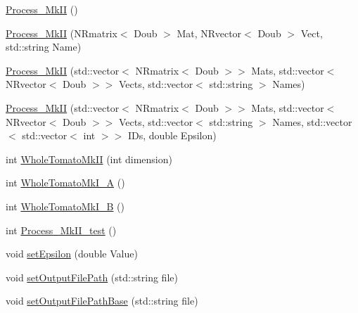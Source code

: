 \begin{DoxyCompactItemize}
\item 
\hyperlink{class_p_r_p_s_evolution_1_1_solve_1_1_process___mk_i_i_a50ba1abbd5eb1953d179a756046ba573}{\-Process\-\_\-\-Mk\-I\-I} ()
\item 
\hyperlink{class_p_r_p_s_evolution_1_1_solve_1_1_process___mk_i_i_a5f2197d42ea75b99a67bb74ff7aa4aae}{\-Process\-\_\-\-Mk\-I\-I} (\-N\-Rmatrix$<$ \-Doub $>$ \-Mat, \-N\-Rvector$<$ \-Doub $>$ \-Vect, std\-::string \-Name)
\item 
\hyperlink{class_p_r_p_s_evolution_1_1_solve_1_1_process___mk_i_i_a146adf1be0c03a472654c4a4ad3a8231}{\-Process\-\_\-\-Mk\-I\-I} (std\-::vector$<$ \-N\-Rmatrix$<$ \-Doub $>$$>$ \-Mats, std\-::vector$<$ \-N\-Rvector$<$ \-Doub $>$$>$ \-Vects, std\-::vector$<$ std\-::string $>$ \-Names)
\item 
\hyperlink{class_p_r_p_s_evolution_1_1_solve_1_1_process___mk_i_i_acd4eedce68bf99c08539ca1852182772}{\-Process\-\_\-\-Mk\-I\-I} (std\-::vector$<$ \-N\-Rmatrix$<$ \-Doub $>$$>$ \-Mats, std\-::vector$<$ \-N\-Rvector$<$ \-Doub $>$$>$ \-Vects, std\-::vector$<$ std\-::string $>$ \-Names, std\-::vector$<$ std\-::vector$<$ int $>$$>$ \-I\-Ds, double \-Epsilon)
\item 
int \hyperlink{class_p_r_p_s_evolution_1_1_solve_1_1_process___mk_i_i_a96e1b1373898248cbbddfe19ea17763d}{\-Whole\-Tomato\-Mk\-I\-I} (int dimension)
\item 
int \hyperlink{class_p_r_p_s_evolution_1_1_solve_1_1_process___mk_i_i_a6f271758fac2a95e39f1c04f5c55e073}{\-Whole\-Tomato\-Mk\-I\-\_\-\-A} ()
\item 
int \hyperlink{class_p_r_p_s_evolution_1_1_solve_1_1_process___mk_i_i_a7c015df21c3ed3dfffeadc04b4dd3ef6}{\-Whole\-Tomato\-Mk\-I\-\_\-\-B} ()
\item 
int \hyperlink{class_p_r_p_s_evolution_1_1_solve_1_1_process___mk_i_i_afcb891a4c158f64cf1d94a5dfda20531}{\-Process\-\_\-\-Mk\-I\-I\-\_\-test} ()
\item 
void \hyperlink{class_p_r_p_s_evolution_1_1_solve_1_1_process___mk_i_i_adb4ab5aac09fdb467345c3610c25c139}{set\-Epsilon} (double \-Value)
\item 
void \hyperlink{class_p_r_p_s_evolution_1_1_solve_1_1_process___mk_i_i_a9fd04320d9c6221534f3cf4db51cf2c5}{set\-Output\-File\-Path} (std\-::string file)
\item 
void \hyperlink{class_p_r_p_s_evolution_1_1_solve_1_1_process___mk_i_i_ad4c6911fcc223a9809b15504f0eae4bd}{set\-Output\-File\-Path\-Base} (std\-::string file)
\item 
$$
\end{DoxyCompactItemize}
